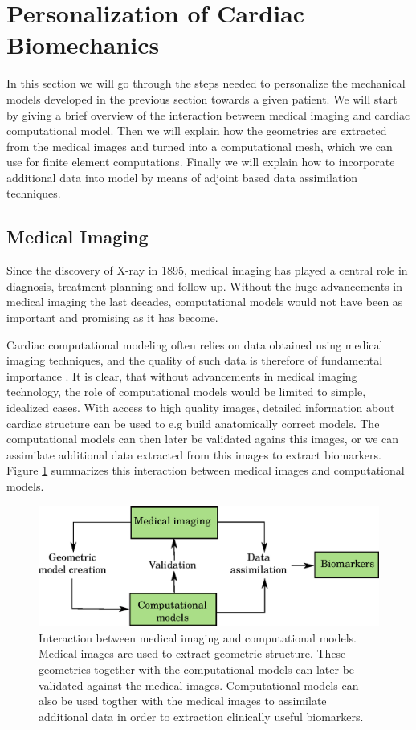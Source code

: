 \section{Personalization of Cardiac Biomechanics}
\label{sec:intro_personalization}
In this section we will go through the steps needed to personalize the
mechanical models developed in the previous section towards a given
patient. We will start by giving a brief overview of the
interaction between medical imaging and cardiac computational model.
Then we will explain how the geometries are extracted from the
medical images and turned into a computational mesh,  which we can use
for finite element computations. Finally we will explain how to
incorporate additional data into model by means of adjoint based data
assimilation techniques.


\subsection{Medical Imaging}

Since the discovery of X-ray in 1895, medical imaging has played a central
role in diagnosis, treatment planning and follow-up. Without the huge
advancements in medical imaging the last decades, computational models
would not have been as important and promising as it has become.


Cardiac computational modeling often relies on data obtained using
medical imaging techniques, and the quality of such data is therefore of
fundamental importance \cite{lamata2014images}. It is clear, that
without advancements in medical imaging technology, the role of
computational models would be limited to simple, idealized cases. With
access to high quality images, detailed information about cardiac structure
can be used to e.g build anatomically correct models. The
computational models can then later be validated agains this images,
or we can assimilate additional data extracted from this images to
extract biomarkers. Figure \ref{fig:cardiac_imaging_model} summarizes
this interaction between medical images and computational models. 

\begin{figure}[htbp]
  \centering
    \includegraphics[width=\textwidth]{chapters/introduction/figures/models.eps}
\caption{Interaction between medical imaging and computational
  models. Medical images are used to extract geometric
  structure. These geometries together with the computational models
  can later be validated against the medical images. Computational
  models can also be used togther with the medical images to
  assimilate additional data in order to extraction clinically useful
  biomarkers. }
\label{fig:cardiac_imaging_model}
\end{figure}



